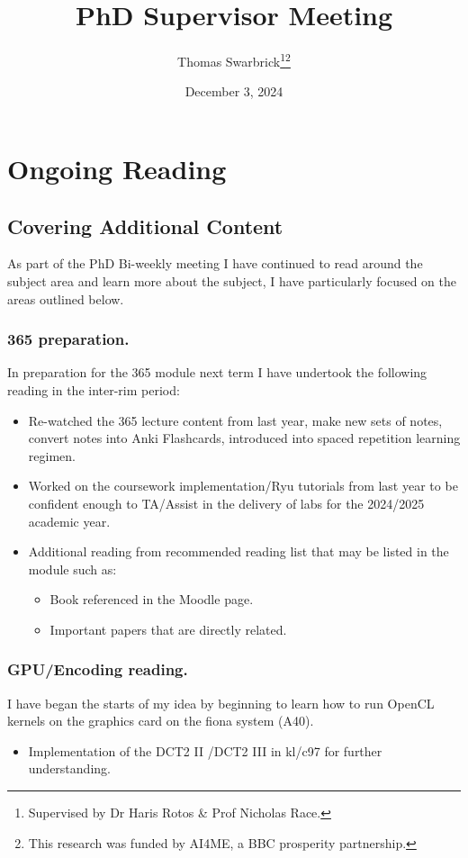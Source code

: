 \documentclass[]{scrreprt}
\title{PhD Supervisor Meeting}
\author{Thomas Swarbrick\footnote{Supervised by Dr Haris Rotos \& Prof Nicholas Race.}\footnote{This research was funded by AI4ME, a BBC prosperity partnership.}}
\date{December 3, 2024}
\begin{document}
\maketitle

\chapter{Ongoing  Reading}
\section{Covering Additional Content}
As part of the PhD Bi-weekly meeting I have continued to read around the subject area and learn more about the subject, I have particularly focused on the areas outlined below.
\subsection{365 preparation.}

In preparation for the 365 module next term I have undertook the following reading in the inter-rim period:
\begin{itemize}
  \item Re-watched the 365 lecture content from last year, make new sets of notes, convert notes into Anki Flashcards, introduced into spaced repetition learning regimen.
  \item Worked on the coursework implementation/Ryu tutorials from last year to be confident enough to TA/Assist in the delivery of labs for the 2024/2025 academic year.
  \item Additional reading from recommended reading list that may be listed in the module such as:
        \begin{itemize}
          \item Book referenced in the Moodle page.
          \item Important papers that are directly related.
        \end{itemize}
\end{itemize}
\subsection{GPU/Encoding reading.}

I have began the starts of my idea by beginning to learn how to run OpenCL kernels on the graphics card on the fiona system (A40).
\begin{itemize}
  \item Implementation of the DCT2 II /DCT2 III in kl/c97 for further understanding.
\end{itemize}
\end{document}
